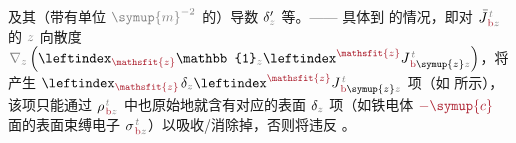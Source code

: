 及其（带有单位 $\mathcolor{gray}{\symup{m}^{-2}}$ 的）导数 $\delta'_{\mathcolor{gray}{z}}$ 等。—— 具体到  的情况，即对 $\bar{J}^{\;\!\mathcolor{gray}{t}}_{\;\!\textcolor{Maroon}{\text{b}}\mathcolor{gray}{z}}$ 的 $\mathcolor{gray}{z}$ 向散度 $\mathcolor{gray}{\nabla_z} \left( \leftindex_{\textcolor{Maroon}{\mathsfit{z}}} {\mathbb{1}}_{\mathcolor{gray}{z}} \leftindex^{\textcolor{Maroon}{\mathsfit{z}}} J^{\;\!\mathcolor{gray}{t}}_{\;\!\textcolor{Maroon}{\text{b}} \symup{z} \mathcolor{gray}{z}} \right)$，将产生 $\leftindex_{\textcolor{Maroon}{\mathsfit{z}}} \;\! \delta_{\mathcolor{gray}{z}} \leftindex^{\textcolor{Maroon}{\mathsfit{z}}} J^{\;\!\mathcolor{gray}{t}}_{\;\!\textcolor{Maroon}{\text{b}} \symup{z} \mathcolor{gray}{z}}$ 项（如  所示），该项只能通过 ${\rho}^{\;\!\mathcolor{gray}{t}}_{\;\!\textcolor{Maroon}{\text{b}}\mathcolor{gray}{z}}$ 中也原始地就含有对应的表面 $\delta_{\mathcolor{gray}{z}}$ 项（如铁电体 $\textcolor{Maroon}{-\symup{c}}$ 面的表面束缚电子 ${\sigma}^{\;\!\mathcolor{gray}{t}}_{\;\!\textcolor{Maroon}{\text{b}}\mathcolor{gray}{z}}$）以吸收/消除掉，否则将违反 。

